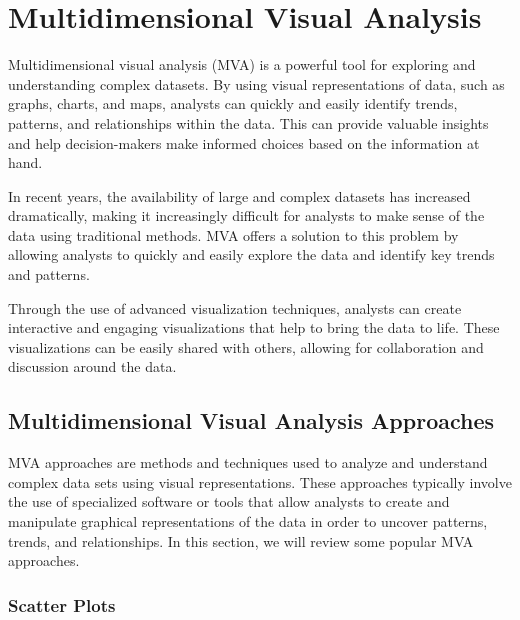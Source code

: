 %
%
% 
% 
% 

\chapter{Multidimensional Visual Analysis}

\label{chap:mva}

Multidimensional visual analysis (MVA) is a powerful tool for exploring and understanding complex datasets. By using visual representations of data, such as graphs, charts, and maps, analysts can quickly and easily identify trends, patterns, and relationships within the data. This can provide valuable insights and help decision-makers make informed choices based on the information at hand.

In recent years, the availability of large and complex datasets has increased dramatically, making it increasingly difficult for analysts to make sense of the data using traditional methods. MVA offers a solution to this problem by allowing analysts to quickly and easily explore the data and identify key trends and patterns.

Through the use of advanced visualization techniques, analysts can create interactive and engaging visualizations that help to bring the data to life. These visualizations can be easily shared with others, allowing for collaboration and discussion around the data.



\section{Multidimensional Visual Analysis Approaches}

MVA approaches are methods and techniques used to analyze and understand complex data sets using visual representations. These approaches typically involve the use of specialized software or tools that allow analysts to create and manipulate graphical representations of the data in order to uncover patterns, trends, and relationships. In this section, we will review some popular MVA approaches.


\subsection{Scatter Plots}

